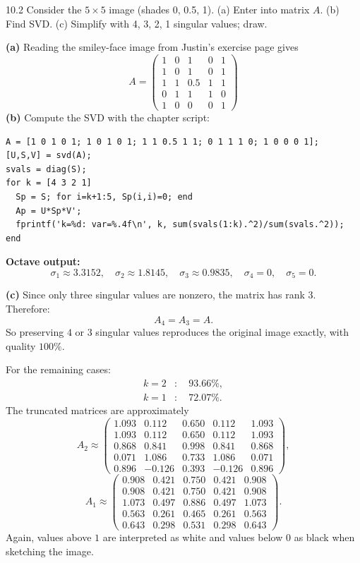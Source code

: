 \begin{exercise}{10.2}
Consider the $5\times5$ image (shades 0, 0.5, 1). (a) Enter into matrix $A$. (b) Find SVD. (c) Simplify with 4, 3, 2, 1 singular values; draw.
\end{exercise}
\begin{solution}
\textbf{(a)} Reading the smiley-face image from Justin's exercise page gives
\[
A = \begin{pmatrix}
1&0&1&0&1\\
1&0&1&0&1\\
1&1&0.5&1&1\\
0&1&1&1&0\\
1&0&0&0&1
\end{pmatrix}
\]
\textbf{(b)} Compute the SVD with the chapter script:
\begin{lstlisting}
A = [1 0 1 0 1; 1 0 1 0 1; 1 1 0.5 1 1; 0 1 1 1 0; 1 0 0 0 1];
[U,S,V] = svd(A);
svals = diag(S);
for k = [4 3 2 1]
  Sp = S; for i=k+1:5, Sp(i,i)=0; end
  Ap = U*Sp*V';
  fprintf('k=%d: var=%.4f\n', k, sum(svals(1:k).^2)/sum(svals.^2));
end
\end{lstlisting}
\textbf{Octave output:}
\[
\sigma_1\approx3.3152,\quad
\sigma_2\approx1.8145,\quad
\sigma_3\approx0.9835,\quad
\sigma_4=0,\quad
\sigma_5=0.
\]

\textbf{(c)} Since only three singular values are nonzero, the matrix has rank $3$. Therefore:
\[
A_4=A_3=A.
\]
So preserving $4$ or $3$ singular values reproduces the original image exactly, with quality $100\%$.

For the remaining cases:
\[
\begin{aligned}
k=2&:\quad 93.66\%,\\
k=1&:\quad 72.07\%.
\end{aligned}
\]
The truncated matrices are approximately
\[
A_2\approx
\begin{pmatrix}
1.093&0.112&0.650&0.112&1.093\\
1.093&0.112&0.650&0.112&1.093\\
0.868&0.841&0.998&0.841&0.868\\
0.071&1.086&0.733&1.086&0.071\\
0.896&-0.126&0.393&-0.126&0.896
\end{pmatrix},
\]
\[
A_1\approx
\begin{pmatrix}
0.908&0.421&0.750&0.421&0.908\\
0.908&0.421&0.750&0.421&0.908\\
1.073&0.497&0.886&0.497&1.073\\
0.563&0.261&0.465&0.261&0.563\\
0.643&0.298&0.531&0.298&0.643
\end{pmatrix}.
\]
Again, values above $1$ are interpreted as white and values below $0$ as black when sketching the image.
\end{solution}

